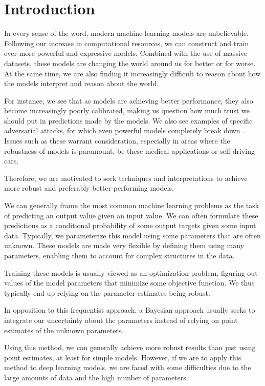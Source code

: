 \chapter{Introduction}
In every sense of the word, modern machine learning models are unbelievable. 
Following our increase in computational resources, we can construct and train ever-more powerful and expressive models.
Combined with the use of massive datasets, these models are changing the world around us for better or for worse. 
At the same time, we are also finding it increasingly difficult to reason about how the models interpret and reason about the world.

For instance, we see that as models are achieving better performance, they also become increasingly poorly calibrated\autocite{guo_calibration_2017}, making us question how much trust we should put in predictions made by the models. 
We also see examples of specific adversarial attacks, for which even powerful models completely break down \autocite{fezza_perceptual_2019}.
Issues such as these warrant consideration, especially in areas where the robustness of models is paramount, be these medical applications or self-driving cars.

Therefore, we are motivated to seek techniques and interpretations to achieve more robust and preferably better-performing models.

We can generally frame the most common machine learning problems as the task of predicting an output value given an input value. 
We can often formulate these predictions as a conditional probability of some output targets given some input data.
Typically, we parameterize this model using some parameters that are often unknown.
These models are made very flexible by defining them using many parameters, enabling them to account for complex structures in the data. 

Training these models is usually viewed as an optimization problem, figuring out values of the model parameters that minimize some objective function.
We thus typically end up relying on the parameter estimates being robust. 

In opposition to this frequentist approach, a Bayesian approach usually seeks to integrate our uncertainty about the parameters instead of relying on point estimates of the unknown parameters.

Using this method, we can generally achieve more robust results than just using point estimates, at least for simple models.
However, if we are to apply this method to deep learning models, we are faced with some difficulties due to the large amounts of data and the high number of parameters.

